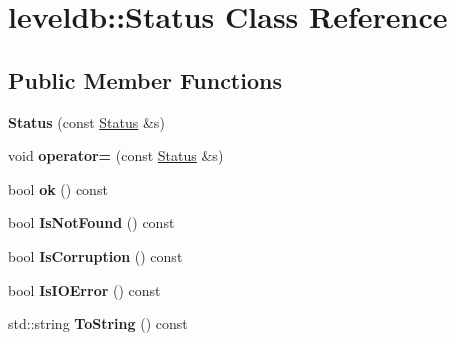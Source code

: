 \hypertarget{classleveldb_1_1_status}{}\section{leveldb\+::Status Class Reference}
\label{classleveldb_1_1_status}
\subsection*{Public Member Functions}
\begin{DoxyCompactItemize}
\item 
\mbox{\label{classleveldb_1_1_status_a4fef11f480cb940d06c43e600076be13}} 
{\bfseries Status} (const \mbox{\hyperlink{classleveldb_1_1_status}{Status}} \&s)
\item 
\mbox{\label{classleveldb_1_1_status_a26a147ba1b39730335f5de14285b2c6a}} 
void {\bfseries operator=} (const \mbox{\hyperlink{classleveldb_1_1_status}{Status}} \&s)
\item 
\mbox{\label{classleveldb_1_1_status_af988e2a8d204019c14f21126d9300362}} 
bool {\bfseries ok} () const
\item 
\mbox{\label{classleveldb_1_1_status_ad4c0469a76324aeb01d96db8bf95737d}} 
bool {\bfseries Is\+Not\+Found} () const
\item 
\mbox{\label{classleveldb_1_1_status_a83077fd4bb808556e6290a25187e2cb3}} 
bool {\bfseries Is\+Corruption} () const
\item 
\mbox{\label{classleveldb_1_1_status_a54c6da2f81ae0dff8bc6cea605ce1de6}} 
bool {\bfseries Is\+I\+O\+Error} () const
\item 
\mbox{\label{classleveldb_1_1_status_a9bd26a7abfa28b572a4f38732bf9218a}} 
std\+::string {\bfseries To\+String} () const
\end{DoxyCompactItemize}

